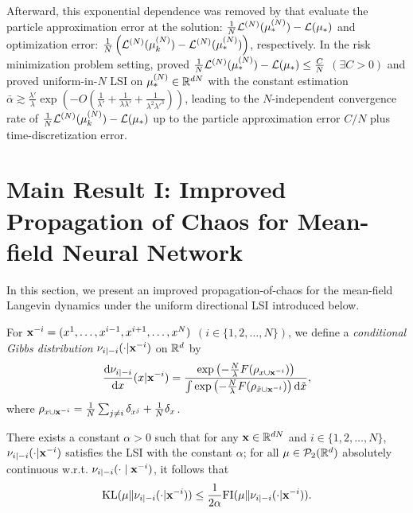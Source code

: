 Afterward, this exponential dependence was removed by \citet{nitanda2024improved,chewi2024uniform} that evaluate the particle approximation error at the solution: $\frac{1}{N}\pow[\cL,N]( \pow[\mu,N]_*) - \cL(\mu_*)$ and optimization error: $\frac{1}{N}\left(\pow[\cL,N]( \pow[\mu,N]_k) - \pow[\cL,N]( \pow[\mu,N]_*) \right)$, respectively.
In the risk minimization problem setting, \citet{nitanda2024improved} proved $\frac{1}{N}\pow[\cL,N]( \pow[\mu,N]_*) - \cL(\mu_*) \leq  \frac{C}{N}$ $(\exists C>0)$ and \citet{chewi2024uniform} proved uniform-in-$N$ LSI on $\pow[\mu,N]_* \in \bR^{dN}$ with the constant estimation $\bar{\alpha} \gtrsim\frac{\lambda'}{\lambda}\exp\left(-O\left( \frac{1}{\lambda'} + \frac{1}{\lambda \lambda'} + \frac{1}{\lambda^2 \lambda'^{3}}\right)\right)$, leading to the $N$-independent convergence rate of $\frac{1}{N}\pow[\cL,N](\pow[\mu,N]_k) - \cL(\mu_*)$ up to the particle approximation error $C/N$ plus time-discretization error.


\section{Main Result I: Improved Propagation of Chaos for Mean-field Neural Network}\label{sec:main_results}
In this section, we present an improved propagation-of-chaos for the mean-field Langevin dynamics under the uniform directional LSI introduced below.
\begin{definition}\label{eq:conditional_gibbs}
    For $\mathbf{x}^{-i}=(x^1,\ldots,x^{i-1},x^{i+1},\ldots, x^N)$ $(i \in \{1,2,\ldots,N\})$, we define a {\it conditional Gibbs distribution} $\nu_{i|-i}(\cdot|\mathbf{x}^{-i})$ on $\mathbb{R}^d$ by 
    \begin{equation*}
        \frac{\mathrm{d} \nu_{i|-i}}{\mathrm{d} x}(x|\mathbf{x}^{-i})
        = \frac{\exp\left(-\frac{N}{\lambda}F(\rho_{x \cup \mathbf{x}^{-i}})\right)}{\int \exp\left(-\frac{N}{\lambda}F(\rho_{\tilde{x}\cup \mathbf{x}^{-i}})\right) \mathrm{d}\tilde{x}}, 
    \end{equation*}
    where $\rho_{x \cup \mathbf{x}^{-i}} = \frac{1}{N}\sum_{j\neq i}\delta_{x^{j}} + \frac{1}{N}\delta_{x}$.
\end{definition}

\begin{assumption}\label{assumption:uniform_directional_lsi}
    There exists a constant $\alpha>0$ such that for any $\mathbf{x} \in \mathbb{R}^{dN}$ and $i \in \{1,2,\ldots,N\}$, $\nu_{i|-i}(\cdot|\mathbf{x}^{-i})$ satisfies the LSI with the constant $\alpha$; for all $\mu \in \mathcal{P}_2(\mathbb{R}^d)$ absolutely continuous w.r.t. $\nu_{i|-i}(\cdot\mid \mathbf{x}^{-i})$, it follows that
    \[ \mathrm{KL}(\mu\| \nu_{i|-i}(\cdot|\mathbf{x}^{-i}) ) \leq \frac{1}{2\alpha} \mathrm{FI}(\mu\|\nu_{i|-i}(\cdot|\mathbf{x}^{-i})). \]
\end{assumption}


